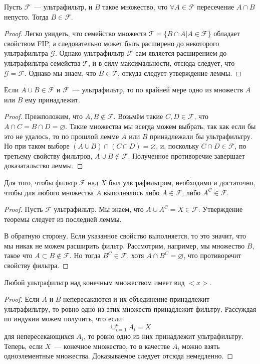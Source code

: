 \begin{lemma}
Пусть $\mathcal{F}$~— ультрафильтр, и $B$ такое множество, что $\forall A\in\mathcal{F}$ пересечение $A\cap B$ непусто. Тогда $B\in\mathcal{F}$.
\end{lemma}
\begin{proof}
Легко увидеть, что семейство множеств $\mathcal{T} = \{B\cap A| A\in\mathcal{F}\}$ обладает свойством FIP, а следовательно может быть расширено до некоторого ультрафильтра $\mathcal{G}$. Однако ультрафильтр $\mathcal{F}$ сам является расширением до ультрафильтра семейства $\mathcal{T}$, и в силу максимальности, отсюда следует, что $\mathcal{G} = \mathcal{F}$. Однако мы знаем, что $B\in\mathcal{T}$, откуда следует утверждение леммы.
\end{proof}

\begin{lemma}
Если $A\cup B\in\mathcal{F}$ и $\mathcal{F}$~— ультрафильтр, то по крайней мере одно из множеств $A$ или $B$ ему принадлежит.
\end{lemma}
\begin{proof}
Прежположим, что $A,B\not\in\mathcal{F}$. Возьмём такие $C, D\in\mathcal{F}$, что $A\cap C = B\cap D = \varnothing$. Такие множества мы всегда можем выбрать, так как если бы это не удалось, то по прошлой лемме $A$ или $B$ принадлежали бы ультрафильтру. Но при таком выборе $(A\cup B)\cap(C\cap D) = \varnothing$, и, поскольку $C\cap D\in\mathcal{F}$, по третьему свойству фильтров, $A\cup B \not\in \mathcal{F}$. Полученное противоречие завершает доказатальство леммы.
\end{proof}

\begin{thm}
Для того, чтобы фильтр $\mathcal{F}$ над $X$ был ультрафильтром, необходимо и достаточно, чтобы для любого множества $A$ выполнялось либо $A\in\mathcal{F}$, либо $A^C\in\mathcal{F}$.
\end{thm}
\begin{proof}
Пусть $\mathcal{F}$ ультрафильтр. Мы знаем, что $A\cup A^C = X \in\mathcal{F}$. Утверждение теоремы следует из последней леммы.


В обратную сторону. Если указанное свойство выполняется, то это значит, что мы никак не можем расширить фильтр. Рассмотрим, например, мы множество $B$, такое что $A\subset B\not\in\mathcal{F}$. Но тогда $B^C\in\mathcal{F}$, хотя $A\cap B^C=\varnothing$, что противоречит свойству фильтра.
\end{proof}

\begin{corollary}
Любой ультрафильтр над конечным множеством имеет вид $<x>$.
\end{corollary}
\begin{proof}
Если $A$ и $B$ непересакаются и их объединение принадлежит ультрафильтру, то ровно одно из этих множеств принадлежит фильтру. Рассуждая по индукии можем получить, что если
$$\cup_{i=1}^n A_i = X$$
для непересекающихся $A_i$, то ровно одно из них принадлежит ультрафильтру. Теперь, если $X$~— конечное множество, то в качестве $A_i$ можно взять одноэлементные множества. Доказываемое следует отсюда немедленно.
\end{proof}

